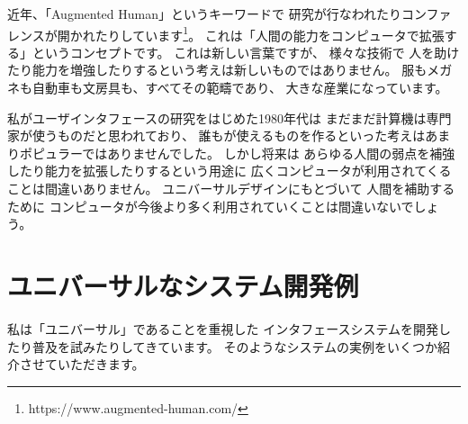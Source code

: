 \documentclass[topics]{compsoft} %
\begin{document}



近年、「Augmented Human」というキーワードで
研究が行なわれたりコンファレンスが開かれたりしています\footnote{
  \textsf{https:{\slash}{\slash}www.augmented-human.com{\slash}}
}。
これは「人間の能力をコンピュータで拡張する」というコンセプトです。
これは新しい言葉ですが、
様々な技術で
人を助けたり能力を増強したりするという考えは新しいものではありません。
服もメガネも自動車も文房具も、すべてその範疇であり、
大きな産業になっています。

私がユーザインタフェースの研究をはじめた1980年代は
まだまだ計算機は専門家が使うものだと思われており、
誰もが使えるものを作るといった考えはあまりポピュラーではありませんでした。
%
しかし将来は
あらゆる人間の弱点を補強したり能力を拡張したりするという用途に
広くコンピュータが利用されてくることは間違いありません。
ユニバーサルデザインにもとづいて
人間を補助するために
コンピュータが今後より多く利用されていくことは間違いないでしょう。

 
\section{ユニバーサルなシステム開発例}

私は「ユニバーサル」であることを重視した
インタフェースシステムを開発したり普及を試みたりしてきています。
そのようなシステムの実例をいくつか紹介させていただきます。
\end{document}
